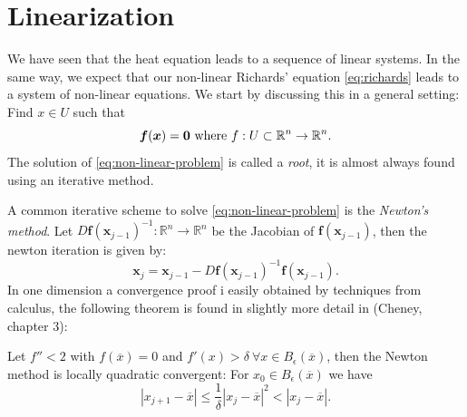 \documentclass[../Main/main.tex]{subfiles}
\begin{document}
	\section{Linearization}
We have seen that the heat equation leads to a sequence of linear systems. In the same way, we expect that our non-linear Richards' equation \eqref{eq:richards} leads to a system of non-linear equations. We start by discussing this in a general setting: Find $x\in U$ such that 
\begin{equation}\label{eq:non-linear-problem}
	 \bm{f}(\bm{x})=\bm{0} \\ \text{ where } f:U\subset\mathbb{R}^n\rightarrow\mathbb{R}^n.
\end{equation}
The solution of \eqref{eq:non-linear-problem} is called a \emph{root}, it is almost always found using an iterative method.\par 
A common iterative scheme to solve \eqref{eq:non-linear-problem} is the \emph{Newton's method}. Let $D\bm{f}(\bm{x}_{j-1})^{-1}:\mathbb{R}^n\rightarrow\mathbb{R}^n$ be the Jacobian of $\bm{f}(\bm{x}_{j-1})$, then the newton iteration is given by:
\begin{equation}
	\bm{x}_j = \bm{x}_{j-1} -D\bm{f}(\bm{x}_{j-1})^{-1}\bm{f}(\bm{x}_{j-1}).
\end{equation}
In one dimension a convergence proof i easily obtained by techniques from calculus, the following theorem is found in  slightly more detail in (Cheney\cite{Cheney}, chapter 3):
\begin{theorem}
	Let $f''<2$ with $f(\overline{x})=0$ and $f'(x)> \delta \ \forall x \in B_{\epsilon}(\overline{x})$, then the Newton method is locally quadratic convergent:  For $x_0\in B_{\epsilon}(\overline{x})$ we have
	\begin{equation}
		| x_{j+1}-\overline{x}| \leq \frac{1}{\delta}|x_j - \overline{x}|^2< |x_j-\overline{x}|.
	\end{equation}
\end{theorem}
\end{document}
